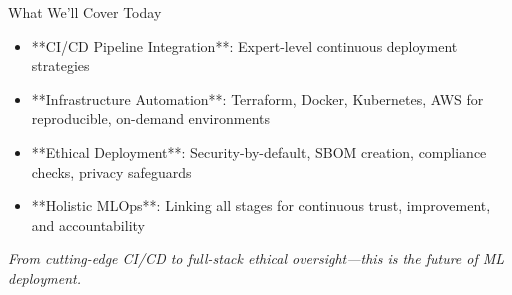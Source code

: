 \documentclass[aspectratio=169]{beamer}
\begin{document}
%
%
%
%
%
\begin{frame}{What We’ll Cover Today}
\begin{itemize}
\item **CI/CD Pipeline Integration**: Expert-level continuous deployment strategies
\item **Infrastructure Automation**: Terraform, Docker, Kubernetes, AWS for reproducible, on-demand environments
\item **Ethical Deployment**: Security-by-default, SBOM creation, compliance checks, privacy safeguards
\item **Holistic MLOps**: Linking all stages for continuous trust, improvement, and accountability
\end{itemize}

\vspace{0.8em}
\emph{From cutting-edge CI/CD to full-stack ethical oversight—this is the future of ML deployment.}
\end{frame}
\end{document}
